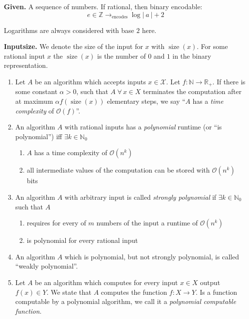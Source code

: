 \documentclass{article}
\newcommand{\card}[1]{\left|\:\!#1\:\!\right|}
\newcommand{\given}[1]{\textbf{Given.} #1\par}
\newcommand{\fall}{\;\forall\,}
\begin{document}
\given{A sequence of numbers. If rational, then binary encodable:
\[
  e \in \mathbb{Z} \rightarrow_{\text{encodes}} \log{\card{a} + 2}
\]}

Logarithms are always considered with base $2$ here.

\textbf{Inputsize.} We denote the size of the input for $x$ with $\operatorname{size}(x)$. For some rational input $x$ the $\operatorname{size}(x)$ is the number of $0$ and $1$ in the binary representation.

\begin{enumerate}
  \item Let $A$ be an algorithm which accepts inputs $x \in \mathcal{X}$. Let $f: \mathbb{N} \rightarrow \mathbb{R}_+$. If there is some constant $\alpha > 0$, such that $A \fall x \in X$ terminates the computation after at maximum $\alpha f(\operatorname{size}(x))$ elementary steps, we say ``$A$ has a \emph{time complexity} of $\mathcal{O}(f)$''.

  \item An algorithm $A$ with rational inputs has a \emph{polynomial} runtime (or ``is polynomial'') iff $\exists k \in \mathbb N_0$
    \begin{enumerate}
      \item $A$ has a time complexity of $\mathcal{O}(n^k)$
      \item all intermediate values of the computation can be stored with $\mathcal{O}(n^k)$ bits
    \end{enumerate}

  \item An algorithm $A$ with arbitrary input is called \emph{strongly polynomial} if $\exists k \in \mathbb{N}_0$ such that $A$
    \begin{enumerate}
      \item requires for every of $m$ numbers of the input a runtime of $\mathcal{O}(n^k)$
      \item is polynomial for every rational input
    \end{enumerate}

  \item An algorithm $A$ which is polynomial, but not strongly polynomial, is called ``weakly polynomial''.

  \item Let $A$ be an algorithm which computes for every input $x \in X$ output $f(x) \in Y$. We state that $A$ computes the function $f: X \rightarrow Y$. Is a function computable by a polynomial algorithm, we call it a \emph{polynomial computable function}.
\end{enumerate}
\end{document}
